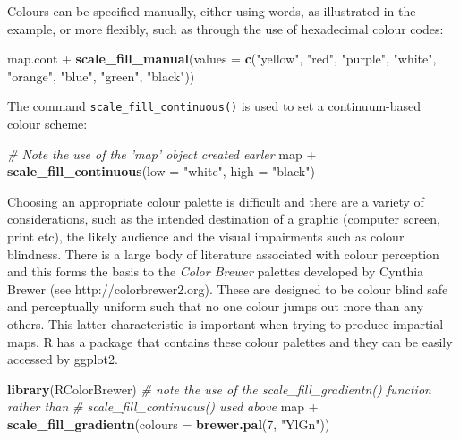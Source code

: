 \documentclass[]{article}
\newenvironment{Shaded}{}{}
\newcommand{\KeywordTok}[1]{\textcolor[rgb]{0.00,0.44,0.13}{\textbf{{#1}}}}
\newcommand{\DataTypeTok}[1]{\textcolor[rgb]{0.56,0.13,0.00}{{#1}}}
\newcommand{\DecValTok}[1]{\textcolor[rgb]{0.25,0.63,0.44}{{#1}}}
\newcommand{\StringTok}[1]{\textcolor[rgb]{0.25,0.44,0.63}{{#1}}}
\newcommand{\CommentTok}[1]{\textcolor[rgb]{0.38,0.63,0.69}{\textit{{#1}}}}
\newcommand{\NormalTok}[1]{{#1}}
\begin{document}
Colours can be specified manually, either using words, as illustrated in the example, or more flexibly, such as through the use of hexadecimal colour codes:

\begin{Shaded}
\begin{Highlighting}[]
\NormalTok{map.cont + }\KeywordTok{scale_fill_manual}\NormalTok{(}\DataTypeTok{values =} \KeywordTok{c}\NormalTok{(}\StringTok{"yellow"}\NormalTok{, }\StringTok{"red"}\NormalTok{, }\StringTok{"purple"}\NormalTok{, }\StringTok{"white"}\NormalTok{, }
    \StringTok{"orange"}\NormalTok{, }\StringTok{"blue"}\NormalTok{, }\StringTok{"green"}\NormalTok{, }\StringTok{"black"}\NormalTok{))}
\end{Highlighting}
\end{Shaded}

The command \texttt{scale\_fill\_continuous()} is used to set
a continuum-based colour scheme:

\begin{Shaded}
\begin{Highlighting}[]
\CommentTok{# Note the use of the 'map' object created earler}
\NormalTok{map + }\KeywordTok{scale_fill_continuous}\NormalTok{(}\DataTypeTok{low =} \StringTok{"white"}\NormalTok{, }\DataTypeTok{high =} \StringTok{"black"}\NormalTok{)}
\end{Highlighting}
\end{Shaded}

Choosing an appropriate colour palette is difficult and there are a variety of considerations,
such as the intended destination of a graphic (computer screen, print etc),
the likely audience and the visual impairments such as colour blindness.
There is a large body of literature associated with colour perception and
this forms the basis to the \emph{Color Brewer} palettes developed
by Cynthia Brewer (see http://colorbrewer2.org). These are designed to
be colour blind safe and perceptually uniform such that no one colour
jumps out more than any others. This latter characteristic is important
when trying to produce impartial maps. R has a package that contains these
colour palettes and they can be easily accessed by ggplot2.

\begin{Shaded}
\begin{Highlighting}[]
\KeywordTok{library}\NormalTok{(RColorBrewer)}
\CommentTok{# note the use of the scale_fill_gradientn() function rather than}
\CommentTok{# scale_fill_continuous() used above}
\NormalTok{map + }\KeywordTok{scale_fill_gradientn}\NormalTok{(}\DataTypeTok{colours =} \KeywordTok{brewer.pal}\NormalTok{(}\DecValTok{7}\NormalTok{, }\StringTok{"YlGn"}\NormalTok{))}
\end{Highlighting}
\end{Shaded}
\end{document}
